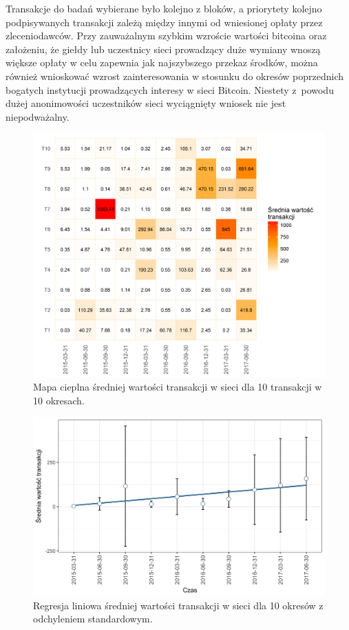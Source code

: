 \documentclass[12pt, twoside, final, openany]{mgr}
\newcommand{\chartsWidth}{0.8}
\begin{document}
\indent Transakcje do badań wybierane było kolejno z bloków, a priorytety kolejno podpisywanych transakcji zależą między innymi od wniesionej opłaty przez zleceniodawców. Przy zauważalnym szybkim wzroście wartości bitcoina oraz założeniu, że giełdy lub uczestnicy sieci prowadzący duże wymiany wnoszą większe opłaty w celu zapewnia jak najszybszego przekaz środków, można również wnioskować wzrost zainteresowania w stosunku do okresów poprzednich bogatych instytucji prowadzących interesy w sieci Bitcoin. Niestety z~powodu dużej anonimowości uczestników sieci wyciągnięty wniosek nie jest niepodważalny.

\begin{figure}[H]
\centering
   \includegraphics[width=\chartsWidth\linewidth]{pictures/wartosc_transakcji/wartosc_transakcji_hm.png}
   \caption{Mapa cieplna średniej wartości transakcji w sieci dla 10 transakcji w 10 okresach.}
   \label{fig:wt1} 
\end{figure}
\begin{figure}[H]
\centering
   \includegraphics[width=\chartsWidth\linewidth]{pictures/wartosc_transakcji/wartosc_transakcji_sda.png}
   \caption{Regresja liniowa średniej wartości transakcji w sieci dla 10 okresów z odchyleniem standardowym.}
   \label{fig:wt2}
\end{figure}
\end{document}
